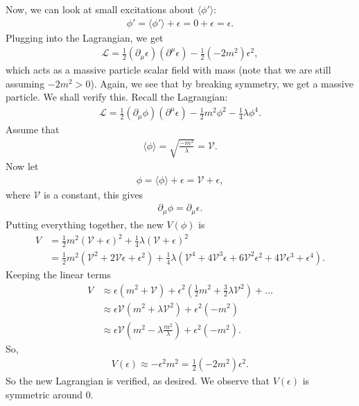 \documentclass[a4paper,11pt]{article}
\numberwithin{equation}{section}
\theoremstyle{definition}
\newcommand{\p}{\partial}
\newcommand{\lag}{\mathcal{L}}
\begin{document}
Now, we can look at small excitations about $\langle \phi' \rangle$:
\begin{align}
\phi' = \langle \phi' \rangle + \epsilon = 0+\epsilon = \epsilon.
\end{align}
Plugging into the Lagrangian, we get
\begin{align}
\lag = \frac{1}{2}(\p_\mu\epsilon)(\p^\mu\epsilon) - \frac{1}{2}(-2m^2)\epsilon^2,
\end{align}
which acts as a massive particle scalar field with mass (note that we are still assuming $-2m^2 > 0$). Again, we see that by breaking symmetry, we get a massive particle. We shall verify this. Recall the Lagrangian:
\begin{align}
\lag = \frac{1}{2}(\p_\mu\phi)(\p^\mu\epsilon) - \frac{1}{2}m^2\phi^2 - \frac{1}{4}\lambda \phi^4.
\end{align}
Assume that
\begin{align}
\langle \phi \rangle = \sqrt{\frac{-m^2}{\lambda}} = \mathcal{V}.
\end{align}
Now let
\begin{align}
\phi = \langle \phi \rangle + \epsilon = \mathcal{V} + \epsilon,
\end{align}
where $\mathcal{V}$ is a constant, this gives
\begin{align}
\p_\mu \phi = \p_\mu\epsilon.
\end{align}
Putting everything together, the new $V(\phi)$ is
\begin{align}
V &= \frac{1}{2}m^2(\mathcal{V}+\epsilon)^2 + \frac{1}{4}\lambda(\mathcal{V}+\epsilon)^2 \\
&= \frac{1}{2}m^2(\mathcal{V}^2 + 2\mathcal{V}\epsilon + \epsilon^2) + \frac{1}{4}\lambda(\mathcal{V}^4 + 4\mathcal{V}^3\epsilon + 6\mathcal{V}^2\epsilon^2 + 4\mathcal{V}\epsilon^3 + \epsilon^4).
\end{align}
Keeping the linear terms
\begin{align}
V &\approx \epsilon(m^2 + \mathcal{V}) + \epsilon^2\left( \frac{1}{2}m^2 + \frac{3}{2}\lambda \mathcal{V}^2 \right) + \dots\\
&\approx \epsilon\mathcal{V}(m^2 + \lambda \mathcal{V}^2) + \epsilon^2(-m^2)\\
&\approx \epsilon \mathcal{V}\left( m^2 - \lambda \frac{m^2}{\lambda} \right) + \epsilon^2(-m^2).
\end{align}
So,
\begin{align}
V(\epsilon) \approx -\epsilon^2m^2 = \frac{1}{2}(-2m^2)\epsilon^2.
\end{align}
So the new Lagrangian is verified, as desired. We observe that $V(\epsilon)$ is symmetric around 0.\\
\end{document}
